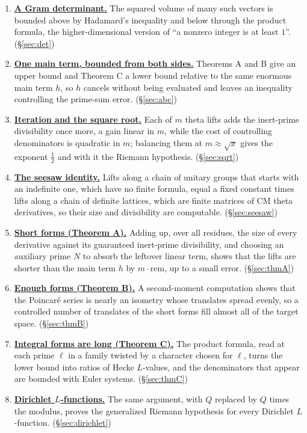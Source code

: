 \documentclass[11pt]{amsart}
\numberwithin{equation}{section}
\theoremstyle{definition}
\theoremstyle{remark}
\begin{document}
\begin{enumerate}[leftmargin=2.2em,label=\textbf{\arabic*.},itemsep=4pt]
\item\label{step:8} \hyperref[sec:det]{\textbf{A Gram determinant.}} The squared volume of many such vectors is bounded above by Hadamard's inequality and below through the product formula, the higher-dimensional version of ``a nonzero integer is at least $1$''. \hfill(\S\ref{sec:det})
\item\label{step:9} \hyperref[sec:abc]{\textbf{One main term, bounded from both sides.}} Theorems A and B give an upper bound and Theorem C a lower bound relative to the same enormous main term $h$, so $h$ cancels without being evaluated and leaves an inequality controlling the prime-sum error. \hfill(\S\ref{sec:abc})
\item\label{step:10} \hyperref[sec:sqrt]{\textbf{Iteration and the square root.}} Each of $m$ theta lifts adds the inert-prime divisibility once more, a gain linear in $m$, while the cost of controlling denominators is quadratic in $m$; balancing them at $m\approx\sqrt x$ gives the exponent $\frac12$ and with it the Riemann hypothesis. \hfill(\S\ref{sec:sqrt})
\item\label{step:11} \hyperref[sec:seesaw]{\textbf{The seesaw identity.}} Lifts along a chain of unitary groups that starts with an indefinite one, which have no finite formula, equal a fixed constant times lifts along a chain of definite lattices, which are finite matrices of CM theta derivatives, so their size and divisibility are computable. \hfill(\S\ref{sec:seesaw})
\item\label{step:12} \hyperref[sec:thmA]{\textbf{Short forms (Theorem A).}} Adding up, over all residues, the size of every derivative against its guaranteed inert-prime divisibility, and choosing an auxiliary prime $N$ to absorb the leftover linear term, shows that the lifts are shorter than the main term $h$ by $m\cdot\mathrm{rem}$, up to a small error. \hfill(\S\ref{sec:thmA})
\item\label{step:13} \hyperref[sec:thmB]{\textbf{Enough forms (Theorem B).}} A second-moment computation shows that the Poincar\'e series is nearly an isometry whose translates spread evenly, so a controlled number of translates of the short forms fill almost all of the target space. \hfill(\S\ref{sec:thmB})
\item\label{step:14} \hyperref[sec:thmC]{\textbf{Integral forms are long (Theorem C).}} The product formula, read at each prime $\ell$ in a family twisted by a character chosen for $\ell$, turns the lower bound into ratios of Hecke $L$-values, and the denominators that appear are bounded with Euler systems. \hfill(\S\ref{sec:thmC})
\item\label{step:15} \hyperref[sec:dirichlet]{\textbf{Dirichlet $L$-functions.}} The same argument, with $Q$ replaced by $Q$ times the modulus, proves the generalized Riemann hypothesis for every Dirichlet $L$-function. \hfill(\S\ref{sec:dirichlet})
\end{enumerate}
\end{document}
